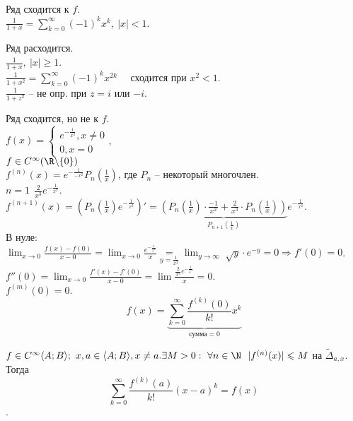 \begin{Example}
	\begin{MyList}
		\item Ряд сходится к $f$.\\
		$\displaystyle \frac{1}{1 + x} = \sum_{k = 0}^{\infty} (-1)^kx^k, \ |x| < 1$.	    
		\item Ряд расходится.\\
		$\displaystyle \frac{1}{1+x}, \ |x| \geqslant 1$.\\
		$\displaystyle \frac{1}{1 + x^2} = \sum_{k = 0}^{\infty} (-1)^k x^{2k}$ \ \ сходится при $x^2 < 1$.\\
		$\displaystyle \frac{1}{1 + z^2}$ -- не опр. при $z = i$ или $-i$.
		\item Ряд сходится, но не к $f$.\\
		$f(x) = \begin{cases}
			e^{-\frac{1}{x^2}}, x \neq 0 \\
			0, x = 0
		\end{cases}$,\\ 
		$f \in C^{\infty}(\R \backslash \{ 0\})$\\
		$f^{(n)}(x) = e^{-\frac1{-x^2}} P_n\left(\frac{1}{x}\right)$, где $P_n$ -- некоторый многочлен.\\
		$n = 1 \ \ \frac{2}{x^3}e^{-\frac{1}{x^2}}$.\\
		$f^{(n+1)} (x) = \left(P_n\left(\frac{1}{x}\right) e^{- \frac{1}{x^2}}\right)' = \underbrace{\left(P_n\left(\frac{1}{x}\right) \cdot \frac{-1}{x^2} + \frac2{x^3} \cdot P_n\left(\frac1{x}\right)\right)}_{P_{n+1}\left(\frac1{x}\right)}e^{-\frac1{x^2}}$.\\
		В нуле: $\displaystyle\lim_{x \to 0} \frac{f(x) - f(0)}{x - 0} = \lim_{x\to 0} \frac{e^{-\frac1{x^2}}}{x} \underset{y = \frac{1}{x^2}}{=} \lim_{y \to \infty} \sqrt[]{y} \cdot e^{-y} = 0 \Rightarrow f'(0) = 0$.\\
		$f''(0) = \displaystyle\lim_{x\to 0} \frac{f'(x) - f'(0)}{x - 0} = \lim \frac{\frac{2}{x^3} e^{-\frac{1}{x^2}}}{x} = 0$.\\
		$f^{(m)} (0) = 0$.\\
		$$f(x) = \underbrace{\sum_{k =0}^{\infty} \frac{f^{(k)}(0)}{k!}x^k}_{\text{сумма} = 0}$$
	\end{MyList}
\end{Example}

\begin{Thm}
	$f \in C^{\infty} \langle A; B \rangle; \ x, a \in \langle A; B \rangle, x \neq a. \\ \exists M > 0: \ \forall n \in \N  \ \ |f^{(n)} (x)| \leqslant M$ на $\widetilde{\Delta}_{a, x}$. \\
    Тогда
	$$\sum_{k = 0}^{\infty} \frac{f^{(k)} (a)}{k!} (x - a)^k = f(x)$$.
\end{Thm}

